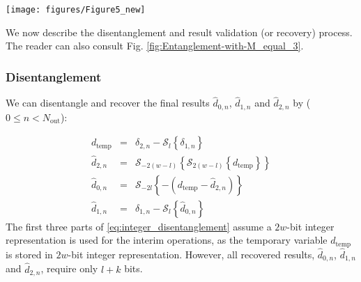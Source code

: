 \documentclass[twocolumn,english,onecolumn]{IEEEtran}
\theoremstyle{plain}
\theoremstyle{plain}
\begin{document}
\begin{figure*}[tp]
\begin{centering}
\texttt{[image: figures/Figure5\_new]}
\par\end{centering}

\protect\caption{The arrows indicate the dynamic range of the represented data elements
(from least-significant to most-significant bits). (a) Illustration
of three input data samples at position $n$; (b) entangled outputs
after entangling and integer LSB processing; (c) illustration of the
first part of \eqref{eq:integer_disentanglement} that produces the
temporary variable $d_{\text{temp}}$. \label{fig:Entanglement-with-M_equal_3} }
\end{figure*}


We now describe the disentanglement and result validation (or recovery)
process. The reader can also consult Fig. \ref{fig:Entanglement-with-M_equal_3}. 


\subsubsection{Disentanglement}

We can disentangle and recover the final results $\hat{d}_{0,n}$,
$\hat{d}_{1,n}$ and $\hat{d}_{2,n}$ by ($0\leq n<N_{\text{out}}$): 

\begin{eqnarray}
d_{\textrm{temp}} & = & \delta_{2,n}-\mathcal{S}_{l}\left\{ \delta_{1,n}\right\} \nonumber \\
\hat{d}_{2,n} & = & \mathcal{S}_{-2\left(w-l\right)}\left\{ \mathcal{S}_{2\left(w-l\right)}\left\{ d_{\textrm{temp}}\right\} \right\} \nonumber \\
\hat{d}_{0,n} & = & \mathcal{S}_{-2l}\left\{ -\left(d_{\textrm{temp}}-\hat{d}_{2,n}\right)\right\} \label{eq:integer_disentanglement}\\
\hat{d}_{1,n} & = & \delta_{1,n}-\mathcal{S}_{l}\left\{ \hat{d}_{0,n}\right\} \nonumber 
\end{eqnarray}
The first three parts of \eqref{eq:integer_disentanglement} assume
a $2w$-bit integer representation is used for the interim operations,
as the temporary variable $d_{\textrm{temp}}$ is stored in $2w$-bit
integer representation. However, all recovered results, $\hat{d}_{0,n}$,
$\hat{d}_{1,n}$ and $\hat{d}_{2,n}$, require only $l+k$ bits. 
\end{document}
